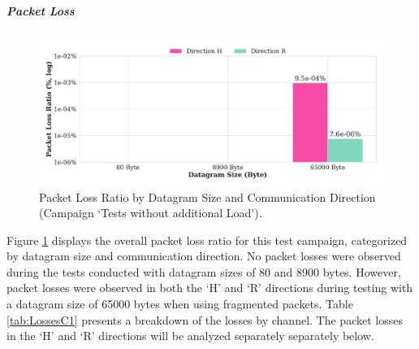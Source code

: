 \subparagraph{Packet Loss}

\begin{figure}[h!]
    \centering
    \includegraphics[width=1\linewidth]{figures/reliability/ihawk/diagr3.pdf}
    \caption{Packet Loss Ratio by Datagram Size and Communication Direction (Campaign `Tests without additional Load').}
    \label{fig:diagr3Loss}
\end{figure}

Figure \ref{fig:diagr3Loss} displays the overall packet loss ratio for this test campaign, categorized by datagram size and communication direction. No packet losses were observed during the tests conducted with datagram sizes of 80 and 8900 bytes. However, packet losses were observed in both the `H' and `R' directions during testing with a datagram size of 65000 bytes when using fragmented packets. Table \ref{tab:LossesC1} presents a breakdown of the losses by channel. The packet losses in the `H' and `R' directions will be analyzed separately separately below.

